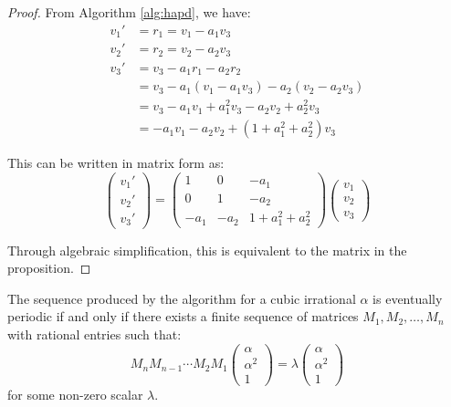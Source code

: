 \begin{proof}
From Algorithm \ref{alg:hapd}, we have:
\begin{align*}
v_1' &= r_1 = v_1 - a_1v_3 \\
v_2' &= r_2 = v_2 - a_2v_3 \\
v_3' &= v_3 - a_1r_1 - a_2r_2 \\
&= v_3 - a_1(v_1 - a_1v_3) - a_2(v_2 - a_2v_3) \\
&= v_3 - a_1v_1 + a_1^2v_3 - a_2v_2 + a_2^2v_3 \\
&= -a_1v_1 - a_2v_2 + (1 + a_1^2 + a_2^2)v_3
\end{align*}

This can be written in matrix form as:
\begin{equation}
\begin{pmatrix} v_1' \\ v_2' \\ v_3' \end{pmatrix} = 
\begin{pmatrix} 
1 & 0 & -a_1 \\
0 & 1 & -a_2 \\
-a_1 & -a_2 & 1 + a_1^2 + a_2^2
\end{pmatrix}
\begin{pmatrix} v_1 \\ v_2 \\ v_3 \end{pmatrix}
\end{equation}

Through algebraic simplification, this is equivalent to the matrix in the proposition.
\end{proof}

\begin{theorem}\label{thm:matrix_periodicity}
The sequence produced by the \HAPD{} algorithm for a cubic irrational $\alpha$ is eventually periodic if and only if there exists a finite sequence of matrices $M_1, M_2, \ldots, M_n$ with rational entries such that:
\begin{equation}
M_n M_{n-1} \cdots M_2 M_1 \begin{pmatrix} \alpha \\ \alpha^2 \\ 1 \end{pmatrix} = \lambda \begin{pmatrix} \alpha \\ \alpha^2 \\ 1 \end{pmatrix}
\end{equation}
for some non-zero scalar $\lambda$.
\end{theorem}

